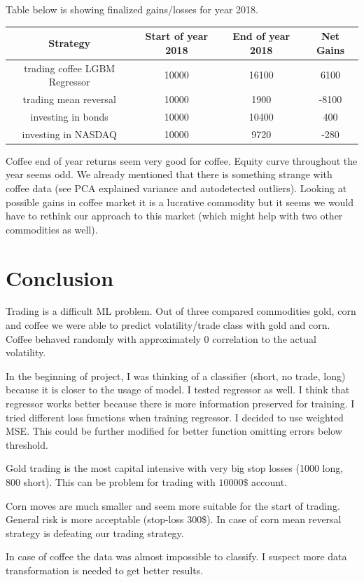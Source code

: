 \documentclass[final,2p]{elsarticle}
\begin{document}
Table below is showing finalized gains/losses for year 2018.

\begin{center}
    \begin{tabular}{cccc}
        Strategy & Start of year 2018 & End of year 2018 & Net Gains \\
        \hline
        trading coffee LGBM Regressor & 10000 & 16100 & 6100 \\
        trading mean reversal & 10000 & 1900 & -8100 \\
        investing in bonds & 10000 & 10400 & 400 \\
        investing in NASDAQ & 10000 & 9720 & -280 \\
    \end{tabular}
\end{center}

Coffee end of year returns seem very good for coffee. Equity curve throughout the year seems odd.
We already mentioned that there is something strange with coffee data (see PCA explained variance and autodetected outliers).
Looking at possible gains in coffee market it is a lucrative commodity but it seems we would have
to rethink our approach to this market (which might help with two other commodities as well).

\section{Conclusion}

Trading is a difficult ML problem. Out of three compared commodities gold, corn and coffee we were able to predict volatility/trade class with gold and corn. Coffee behaved randomly with approximately 0 correlation to the actual volatility.

In the beginning of project, I was thinking of a classifier (short, no trade, long) because it is closer to the usage of model. I tested regressor as well. I think that regressor works better because there is more information preserved for training. I tried different loss functions when training regressor. I decided to use weighted MSE. This could be further modified for better function omitting errors below threshold.

Gold trading is the most capital intensive with very big stop losses (1000 long, 800 short). This can be problem for trading with $10 000\$$ account.

Corn moves are much smaller and seem more suitable for the start of trading. General risk is more acceptable (stop-loss 300\$). In case of corn mean reversal strategy is defeating our trading strategy.

In case of coffee the data was almost impossible to classify. I suspect more data transformation is needed to get better results.
\end{document}
